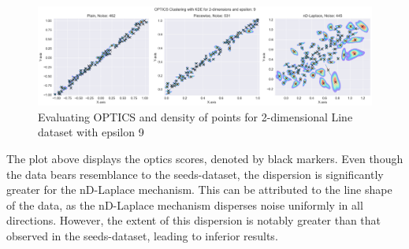 \begin{figure}[H]
\centering
\includegraphics[width=1\linewidth]{Discussion/behaviour-2d-line-dataset&optics.png}
\caption{Evaluating OPTICS and density of points for 2-dimensional Line dataset with epsilon 9}
\label{fig:validation-Line-dataset_comparison_2d-laplace}
\end{figure}

The plot above displays the \gls{optics} scores, denoted by black markers. Even though the data bears resemblance to the seeds-dataset, the dispersion is significantly greater for the nD-Laplace mechanism. This can be attributed to the line shape of the data, as the nD-Laplace mechanism disperses noise uniformly in all directions. However, the extent of this dispersion is notably greater than that observed in the seeds-dataset, leading to inferior results.

